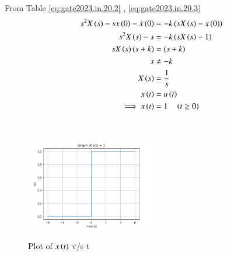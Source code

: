 \documentclass[journal,12pt,twocolumn]{IEEEtran}
\theoremstyle{remark}
\begin{document}
From Table \eqref{eq:gate2023.in.20.2} , \eqref{eq:gate2023.in.20.3} 
\begin{align}
s^2 X\left(s\right) - sx\left(0\right) - \dot{x}\left(0\right) &= -k\left(sX\left(s\right) - x\left(0\right)\right) \\
s^2 X\left(s\right) - s &= -k\left(sX\left(s\right)-1\right) \\
sX\left(s\right)\left(s+k\right)&=\left(s+k\right)\\
     \notag s &\neq -k\\
     X\left(s\right)&=\frac{1}{s}  \\
     x\left(t\right)&=u\left(t\right)\\
      \implies x\left(t\right)&=1 \quad \left(t\geq 0\right)
\end{align}\\
\pagebreak
\begin{figure}[h]
    \includegraphics[width=0.5\textwidth]{figs/x(t)_vs_t.png}\label{fig:plot}
    \caption{Plot of $x\left(t\right)$ v/s t}
\end{figure}
\end{document}
